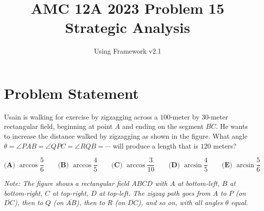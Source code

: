 \documentclass[11pt]{article}
\begin{document}
\title{\textbf{AMC 12A 2023 Problem 15}\\Strategic Analysis}
\author{Using Framework v2.1}
\date{}
\maketitle

\section*{Problem Statement}

Usain is walking for exercise by zigzagging across a $100$-meter by $30$-meter rectangular field, beginning at point $A$ and ending on the segment $\overline{BC}$. He wants to increase the distance walked by zigzagging as shown in the figure. What angle $\theta = \angle PAB = \angle QPC = \angle RQB = \cdots$ will produce a length that is $120$ meters?

\[\textbf{(A) } \arccos\frac{5}{6} \qquad \textbf{(B) } \arccos\frac{4}{5} \qquad \textbf{(C) } \arccos\frac{3}{10} \qquad \textbf{(D) } \arcsin\frac{4}{5} \qquad \textbf{(E) } \arcsin\frac{5}{6}\]

\textit{Note: The figure shows a rectangular field $ABCD$ with $A$ at bottom-left, $B$ at bottom-right, $C$ at top-right, $D$ at top-left. The zigzag path goes from $A$ to $P$ (on $\overline{DC}$), then to $Q$ (on $\overline{AB}$), then to $R$ (on $\overline{DC}$), and so on, with all angles $\theta$ equal.}
\end{document}
